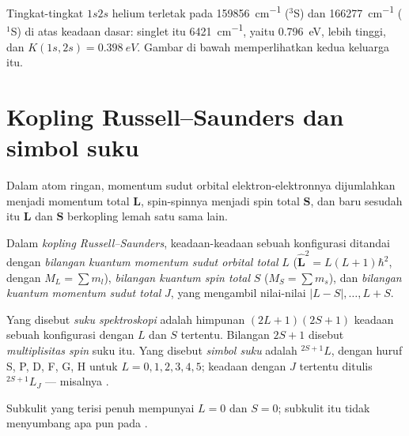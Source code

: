 \begin{example}\label{ex:b3:many-electron-atoms:K}
Tingkat-tingkat $1s2s$ helium terletak pada \qty{159856}{cm^{-1}} (${}^3$S) dan
\qty{166277}{cm^{-1}} (${}^1$S) di atas keadaan dasar: singlet itu
\qty{6421}{cm^{-1}}, yaitu \qty{0.796}{eV}, lebih tinggi, dan $K(1s,2s) = \qty{0.398}{eV}$. Gambar di bawah memperlihatkan kedua keluarga itu.
\end{example}

\section{Kopling Russell--Saunders dan simbol suku}

Dalam atom ringan, momentum sudut orbital elektron-elektronnya dijumlahkan
menjadi momentum total $\mathbf L$, spin-spinnya menjadi spin total
$\mathbf S$, dan baru sesudah itu $\mathbf L$ dan $\mathbf S$ berkopling
lemah satu sama lain.

\begin{definition}\label{def:b3:many-electron-atoms:russell-saunders}
Dalam \emph{kopling Russell--Saunders},
keadaan-keadaan sebuah konfigurasi ditandai dengan \emph{bilangan kuantum
momentum sudut orbital total}
$L$ ($\hat{\mathbf L}^2 = L(L+1)\hbar^2$, dengan $M_L = \sum m_l$),
\emph{bilangan kuantum spin total} $S$
($M_S = \sum m_s$), dan \emph{bilangan kuantum momentum sudut
total} $J$, yang mengambil
nilai-nilai $|L - S|, \dots, L + S$.
\end{definition}

\begin{definition}\label{def:b3:many-electron-atoms:term}
Yang disebut \emph{suku spektroskopi} adalah
himpunan $(2L+1)(2S+1)$ keadaan sebuah konfigurasi dengan $L$ dan $S$
tertentu. Bilangan $2S + 1$ disebut \emph{multiplisitas spin}
suku itu. Yang disebut \emph{simbol suku} adalah
${}^{2S+1}L$, dengan huruf S, P, D, F, G, H untuk $L = 0, 1, 2, 3, 4, 5$;
keadaan dengan $J$ tertentu ditulis ${}^{2S+1}L_J$ --- misalnya
.
\end{definition}

\begin{proposition}\label{prop:b3:many-electron-atoms:closed-shell}
Subkulit yang terisi penuh mempunyai $L = 0$ dan $S = 0$; subkulit itu tidak
menyumbang apa pun pada .
\end{proposition}

